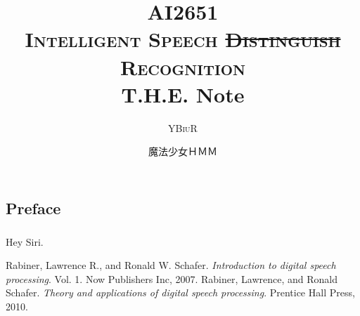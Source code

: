 \documentclass[oneside]{book}
\title{\textsc{AI2651\\Intelligent Speech \sout{Distinguish} Recognition}\\ T.H.E. Note}
\author{\textsc{YBiuR}}
\date{魔法少女ＨＭＭ}
\theoremstyle{definition}
\theoremstyle{remark}
\begin{document}
\begin{spacing}{1.5}
\setlength{\parindent}{0em}

\frontmatter
\maketitle
\chapter*{Preface}
\paragraph{}Hey Siri.
\mainmatter





\begin{thebibliography}{42}
     Rabiner, Lawrence R., and Ronald W. Schafer. \textit{Introduction to digital speech processing}. Vol. 1. Now Publishers Inc, 2007.
     Rabiner, Lawrence, and Ronald Schafer. \textit{Theory and applications of digital speech processing}. Prentice Hall Press, 2010.
\end{thebibliography}

\end{spacing}
\end{document}
